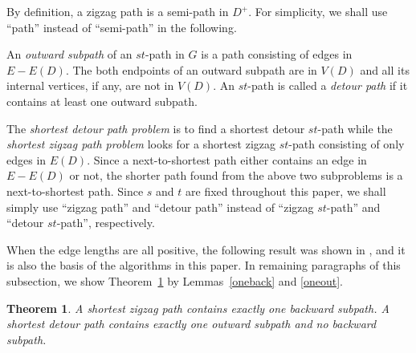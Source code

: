 \documentclass[review]{elsarticle}
\newtheorem{thm}{Theorem}
\begin{document}
By definition, a zigzag path is a semi-path in $D^+$. For
simplicity, we shall use ``path'' instead of ``semi-path'' in the
following.

\begin{defi}
An {\em outward subpath} of an $st$-path in $G$ is a path consisting
of edges in $E-E(D)$. The both endpoints of an outward subpath are
in $V(D)$ and all its internal vertices, if any, are not in $V(D)$.
An $st$-path is called a {\em detour path} if it contains at least
one outward subpath.
\end{defi}

The {\em shortest detour path problem} is to find a shortest detour
$st$-path while the {\em shortest zigzag path problem} looks for a
shortest zigzag $st$-path consisting of only edges in $E(D)$. Since
a next-to-shortest path either contains an edge in $E-E(D)$ or not,
the shorter path found from the above two subproblems is a
next-to-shortest path. Since $s$ and $t$ are fixed throughout this
paper, we shall simply use ``zigzag path'' and ``detour path''
instead of ``zigzag $st$-path'' and ``detour $st$-path'',
respectively.

When the edge lengths are all positive, the following result was
shown in \cite{kao11}, and it is also the basis of the algorithms in
this paper. In remaining paragraphs of this subsection, we show
Theorem~\ref{backout} by Lemmas~\ref{oneback} and \ref{oneout}.

\begin{thm}\label{backout}
A shortest zigzag path contains exactly one backward subpath. A
shortest detour path contains exactly one outward subpath and no
backward subpath.
\end{thm}
\end{document}
